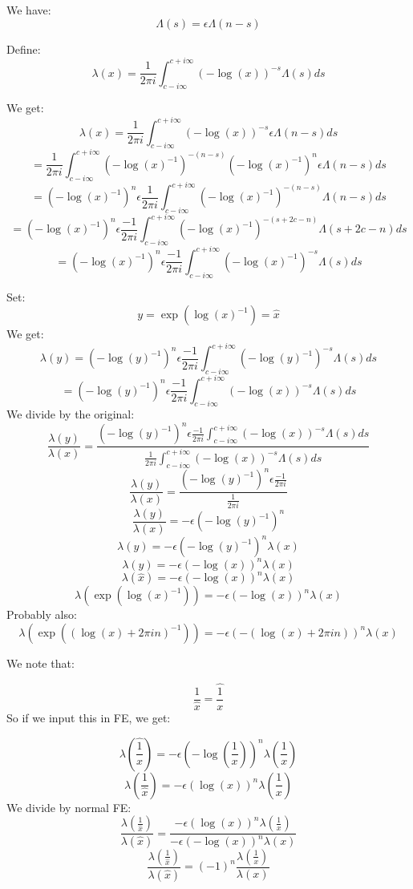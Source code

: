 \documentclass[a4paper]{amsart}
\begin{document}
We have: 
$$\Lambda(s) = \epsilon \Lambda(n - s)$$

Define: 
$$\lambda(x) = \frac{1}{2\pi i} \int_{c - i\infty}^{c + i\infty} (-\log(x))^{-s} \Lambda(s) ds$$

We get:
$$\lambda(x) = \frac{1}{2\pi i} \int_{c - i\infty}^{c + i\infty} (-\log(x))^{-s} \epsilon \Lambda(n - s) ds$$
$$ = \frac{1}{2\pi i} \int_{c - i\infty}^{c + i\infty} (-\log(x)^{-1})^{-(n - s)} (-\log(x)^{-1})^{n} \epsilon \Lambda(n - s) ds$$
$$ = (-\log(x)^{-1})^{n} \epsilon \frac{1}{2\pi i} \int_{c - i\infty}^{c + i\infty} (-\log(x)^{-1})^{-(n - s)} \Lambda(n - s) ds$$
$$ = (-\log(x)^{-1})^{n} \epsilon \frac{-1}{2\pi i} \int_{c - i\infty}^{c + i\infty} (-\log(x)^{-1})^{-(s + 2c - n)} \Lambda(s + 2c - n) ds$$
$$ = (-\log(x)^{-1})^{n} \epsilon \frac{-1}{2\pi i} \int_{c - i\infty}^{c + i\infty} (-\log(x)^{-1})^{-s} \Lambda(s) ds$$

Set: 
$$y = \exp(\log(x)^{-1}) = \hat{x}$$
We get: 
$$\lambda(y) = (-\log(y)^{-1})^{n} \epsilon \frac{-1}{2\pi i} \int_{c - i\infty}^{c + i\infty} (-\log(y)^{-1})^{-s} \Lambda(s) ds$$
$$ = (-\log(y)^{-1})^{n} \epsilon \frac{-1}{2\pi i} \int_{c - i\infty}^{c + i\infty} (-\log(x))^{-s} \Lambda(s) ds$$
We divide by the original:
$$\frac{\lambda(y)}{\lambda(x)} = \frac{(-\log(y)^{-1})^{n} \epsilon \frac{-1}{2\pi i} \int_{c - i\infty}^{c + i\infty} (-\log(x))^{-s} \Lambda(s) ds}{\frac{1}{2\pi i} \int_{c - i\infty}^{c + i\infty} (-\log(x))^{-s} \Lambda(s) ds}$$
$$\frac{\lambda(y)}{\lambda(x)} = \frac{(-\log(y)^{-1})^{n} \epsilon \frac{-1}{2\pi i}}{\frac{1}{2\pi i}}$$
$$\frac{\lambda(y)}{\lambda(x)} = -\epsilon(-\log(y)^{-1})^{n}$$
$$\lambda(y) = -\epsilon(-\log(y)^{-1})^{n}\lambda(x)$$
$$\lambda(y) = -\epsilon(-\log(x))^{n}\lambda(x)$$
$$\lambda(\hat{x}) = -\epsilon(-\log(x))^{n}\lambda(x)$$
$$\lambda(\exp(\log(x)^{-1})) = -\epsilon(-\log(x))^{n}\lambda(x)$$
Probably also:
$$\lambda(\exp((\log(x) + 2\pi i n)^{-1})) = -\epsilon(-(\log(x) + 2\pi i n))^{n}\lambda(x)$$

We note that:

$$\frac{1}{\hat{x}} = \hat{\frac{1}{x}}$$
So if we input this in FE, we get:

$$\lambda(\hat{\frac{1}{x}}) = -\epsilon(-\log(\frac{1}{x}))^{n}\lambda(\frac{1}{x})$$
$$\lambda(\frac{1}{\hat{x}}) = -\epsilon(\log(x))^{n}\lambda(\frac{1}{x})$$
We divide by normal FE:
$$\frac{\lambda(\frac{1}{\hat{x}})}{\lambda(\hat{x})} = \frac{-\epsilon(\log(x))^{n}\lambda(\frac{1}{x})}{-\epsilon(-\log(x))^{n}\lambda(x)}$$
$$\frac{\lambda(\frac{1}{\hat{x}})}{\lambda(\hat{x})} = (-1)^n \frac{\lambda(\frac{1}{x})}{\lambda(x)}$$
\end{document}
